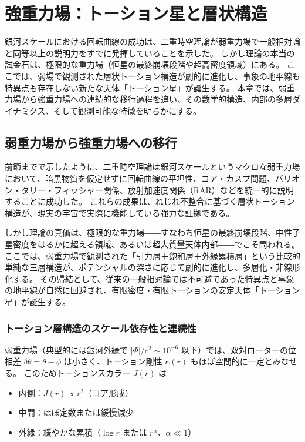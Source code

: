 \documentclass[dvipdfmx,a4paper]{jsbook}
\theoremstyle{definition}
\theoremstyle{remark}
\begin{document}
\chapter{強重力場：トーション星と層状構造}
\label{chap:strong-field}

銀河スケールにおける回転曲線の成功は、二重時空理論が弱重力場で一般相対論と同等以上の説明力をすでに発揮していることを示した。
しかし理論の本当の試金石は、極限的な重力場（恒星の最終崩壊段階や超高密度領域）にある。
ここでは、弱場で観測された層状トーション構造が劇的に進化し、事象の地平線も特異点も存在しない新たな天体「トーション星」が誕生する。
本章では、弱重力場から強重力場への連続的な移行過程を追い、その数学的構造、内部の多層ダイナミクス、そして観測可能な特徴を明らかにする。

\section{弱重力場から強重力場への移行}
\label{sec:weak-to-strong-transition}

前節までで示したように、二重時空理論は銀河スケールというマクロな弱重力場において、暗黒物質を仮定せずに回転曲線の平坦性、コア・カスプ問題、バリオン・タリー・フィッシャー関係、放射加速度関係（RAR）などを統一的に説明することに成功した。
これらの成果は、ねじれ不整合に基づく層状トーション構造が、現実の宇宙で実際に機能している強力な証拠である。

しかし理論の真価は、極限的な重力場――すなわち恒星の最終崩壊段階、中性子星密度をはるかに超える領域、あるいは超大質量天体内部――でこそ問われる。
ここでは、弱重力場で観測された「引力層＋飽和層＋外縁累積層」という比較的単純な三層構造が、ポテンシャルの深さに応じて劇的に進化し、多層化・非線形化する。
その帰結として、従来の一般相対論では不可避であった特異点と事象の地平線が自然に回避され、有限密度・有限トーションの安定天体「トーション星」が誕生する。

\subsection{トーション層構造のスケール依存性と連続性}

弱重力場（典型的には銀河外縁で $|\Phi|/c^2 \sim 10^{-6}$ 以下）では、双対ローターの位相差 $\delta\theta = \theta - \phi$ は小さく、トーション剛性 $\kappa(r)$ もほぼ空間的に一定とみなせる。
このためトーションスカラー $J(r)$ は

\begin{itemize}
  \item 内側：$J(r) \propto r^2$（コア形成）
  \item 中間：ほぼ定数または緩慢減少
  \item 外縁：緩やかな累積（$\log r$ または $r^\alpha$、$\alpha \ll 1$）
\end{itemize}
\end{document}
